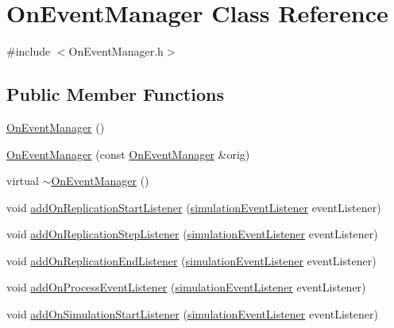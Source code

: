 \hypertarget{class_on_event_manager}{}\section{On\+Event\+Manager Class Reference}
\label{class_on_event_manager}


{\ttfamily \#include $<$On\+Event\+Manager.\+h$>$}

\subsection*{Public Member Functions}
\begin{DoxyCompactItemize}
\item 
\hyperlink{class_on_event_manager_a15f856c9d10d1c8fc002a7ec6f51bae9}{On\+Event\+Manager} ()
\item 
\hyperlink{class_on_event_manager_ae83cecca7e8a1f7d4e921cfa201c7fff}{On\+Event\+Manager} (const \hyperlink{class_on_event_manager}{On\+Event\+Manager} \&orig)
\item 
virtual \hyperlink{class_on_event_manager_aab0f5d9e7698be7860decf65e487de42}{$\sim$\+On\+Event\+Manager} ()
\item 
void \hyperlink{class_on_event_manager_a7c8270fc85b56ef80bbba29c1e2f4a22}{add\+On\+Replication\+Start\+Listener} (\hyperlink{_on_event_manager_8h_a23e254b33ca0caca5421c78af1b7542d}{simulation\+Event\+Listener} event\+Listener)
\item 
void \hyperlink{class_on_event_manager_ad42eb83d9a6614ae13bd49943bc68e7e}{add\+On\+Replication\+Step\+Listener} (\hyperlink{_on_event_manager_8h_a23e254b33ca0caca5421c78af1b7542d}{simulation\+Event\+Listener} event\+Listener)
\item 
void \hyperlink{class_on_event_manager_af4d92bf77d1811fa3168ed2fbb1ce99c}{add\+On\+Replication\+End\+Listener} (\hyperlink{_on_event_manager_8h_a23e254b33ca0caca5421c78af1b7542d}{simulation\+Event\+Listener} event\+Listener)
\item 
void \hyperlink{class_on_event_manager_aa5fa457960768e89460936cd3013daec}{add\+On\+Process\+Event\+Listener} (\hyperlink{_on_event_manager_8h_a23e254b33ca0caca5421c78af1b7542d}{simulation\+Event\+Listener} event\+Listener)
\item 
void \hyperlink{class_on_event_manager_a4341d723dabd237c98fe5a4fdc435b29}{add\+On\+Simulation\+Start\+Listener} (\hyperlink{_on_event_manager_8h_a23e254b33ca0caca5421c78af1b7542d}{simulation\+Event\+Listener} event\+Listener)
\item 

\end{DoxyCompactItemize}

